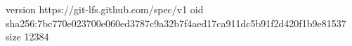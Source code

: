 version https://git-lfs.github.com/spec/v1
oid sha256:7bc770e023700e060ed3787c9a32b7f4aed17ca911dc5b91f2d420f1b9e81537
size 12384
